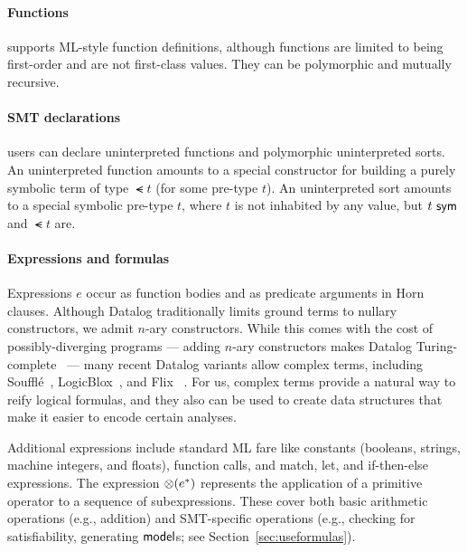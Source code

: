 \documentclass[acmsmall,screen,nonacm]{acmart}
\theoremstyle{definition}
\begin{document}
\paragraph{Functions}
\Name supports ML-style function definitions, although functions are limited to
being first-order and are not first-class values.
They can be polymorphic and mutually recursive.

\paragraph{SMT declarations}
\Name users can declare uninterpreted functions and polymorphic uninterpreted
sorts.
An uninterpreted function amounts to a special constructor for building a purely symbolic
term of type $\smt{t}$ (for some pre-type $t$).
An uninterpreted sort amounts to a special symbolic pre-type $t$, where $t$ is
not inhabited by any value, but ${t} ~ \mathsf{sym}$ and $\smt{t}$ are.

\paragraph{Expressions and formulas}
Expressions $e$ occur as function bodies and as predicate arguments in Horn
clauses.
Although Datalog traditionally limits ground terms to nullary constructors, we
admit $n$-ary constructors.
While this comes with the cost of possibly-diverging programs --- adding
$n$-ary constructors makes Datalog Turing-complete~\citep{recursivequery} ---
many recent Datalog variants allow complex terms, including
Souffl\'e~\citep{souffle2}, LogicBlox~\citep{logicblox}, and Flix
~\citep{flix}.
For us, complex terms provide a natural way to reify logical formulas, and they
also can be used to create data structures that make it easier to encode
certain analyses.

Additional \Name expressions include standard ML fare like constants (booleans,
strings, machine integers, and floats), function calls, and match, let, and
if-then-else expressions.
The expression $\mathord{\otimes}({e^*})$ represents the application of a primitive
operator to a sequence of subexpressions.
These cover both basic arithmetic operations (e.g., addition) and SMT-specific
operations (e.g., checking for satisfiability, generating $\mathsf{model}$s; see
Section~\ref{sec:useformulas}).
\end{document}

